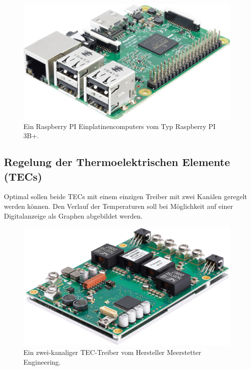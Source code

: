 \begin{figure}[H]
    \centering
    \includegraphics[scale=0.2]{98_images/raspberry_pi_version_3_b.jpg}
    \caption{Ein Raspberry PI Einplatinencomputers vom Typ Raspberry PI 3B+.}
    \label{fig:raspberry_pi}
\end{figure}

\subsection{Regelung der Thermoelektrischen Elemente (TECs)}
Optimal sollen beide TECs mit einem einzigen Treiber mit zwei Kanälen geregelt werden können. Den Verlauf der Temperaturen soll bei Möglichkeit auf einer Digitalanzeige als Graphen abgebildet werden.

\begin{figure}[H]
    \centering
    \includegraphics[scale=0.25]{98_images/tec_controller_real_isometry_meerstetter.PNG}
    \caption{Ein zwei-kanaliger TEC-Treiber vom Hersteller Meerstetter Engineering.}
    \label{fig:tec_controller_free}
\end{figure}

